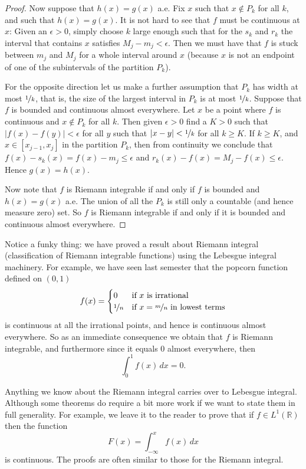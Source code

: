 \documentclass[12pt]{book}
\newcommand{\abs}[1]{\left\lvert {#1} \right\rvert}
\newcommand{\R}{{\mathbb{R}}}
\theoremstyle{plain}
\theoremstyle{remark}
\theoremstyle{definition}
\theoremstyle{exercise}
\theoremstyle{example}
\begin{document}
\begin{proof}
Now suppose that $h(x) = g(x)$ a.e.
Fix $x$ such that $x \notin P_k$ for all $k$, and such that
$h(x) = g(x)$.
It is not hard to see that $f$
must be continuous at $x$:  Given an $\epsilon > 0$, simply
choose $k$ large enough
such that for the $s_k$ and $r_k$
the interval that contains $x$ satisfies
$M_j - m_j < \epsilon$.
Then we must have that $f$ is stuck between
$m_j$ and $M_j$ for a whole interval around $x$ (because $x$ is not
an endpoint of one of the subintervals of the partition $P_k$).

For the opposite direction let us make a further assumption that
$P_k$ has width at most $\nicefrac{1}{k}$, that is, the size of the
largest interval in $P_k$ is at most $\nicefrac{1}{k}$.  Suppose that
$f$ is bounded and continuous almost everywhere.  Let $x$ be a point
where $f$ is continuous and $x \notin P_k$ for all $k$.  Then given $\epsilon
> 0$ find a $K > 0$ such that $\abs{f(x) - f(y)} < \epsilon$ for all
$y$ such that $\abs{x-y} < \nicefrac{1}{k}$ for all $k \geq K$.  If $k \geq
K$, and $x \in [x_{j-1},x_j]$ in the partition $P_k$, then
from continuity we conclude that $f(x)-s_k(x) = f(x) - m_j \leq \epsilon$ and
$r_k(x) - f(x) = M_j - f(x) \leq \epsilon$.   Hence $g(x) = h(x)$.

Now note that $f$ is Riemann integrable if and only if $f$
is bounded and $h(x) = g(x)$ a.e.
The union of all the $P_k$ is still only a countable
(and hence measure zero) set.  So $f$ is Riemann integrable if
and only if it is bounded and continuous almost everywhere.
\end{proof}

\medskip

Notice a funky thing: we have proved a result about Riemann integral
(classification of Riemann integrable functions)
using the Lebesgue integral machinery.  For example, we have seen
last semester that the popcorn function defined on $(0,1)$
$$
f(x) =
\begin{cases}
0 & \text{if $x$ is irrational} \\
\nicefrac{1}{n} & \text{if $x = \nicefrac{m}{n}$ in lowest terms}
\end{cases}
$$
is continuous at all the irrational points, and hence is continuous almost
everywhere.  So as an immediate consequence we obtain that $f$
is Riemann integrable, and furthermore since it equals 0
almost everywhere, then
$$
\int_0^1 f(x)\, dx = 0 .
$$

\medskip

Anything we know about the Riemann integral carries over
to Lebesgue integral.  Although some theorems do require a bit
more work if we want to state them in full generality.
For example, we leave it to the reader to prove that
if $f \in L^1(\R)$ then the function
$$
F(x) = \int_{-\infty}^x f(x)\, dx
$$
is continuous.  The proofs are often similar to those for
the Riemann integral.
\end{document}
